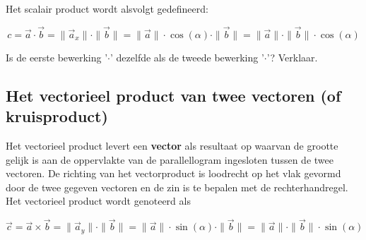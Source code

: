 \documentclass{ximera}
\begin{document}
Het scalair product wordt alsvolgt gedefineerd: 

$$
c = \vec{a} \cdot \vec{b} = \| \vec{a}_x \| \cdot \|\vec{b}\| = \|\vec{a}\| \cdot \cos(\alpha) \cdot \|\vec{b}\| = \| \vec{a}\| \cdot \| \vec{b}\| \cdot \cos(\alpha)
$$

\begin{quickquestion*}{}{}
    Is de eerste bewerking '\(\cdot\)' dezelfde als de tweede bewerking '\(\cdot\)'? Verklaar. 
\end{quickquestion*}

\begin{image}
\end{image}

\subsection*{Het vectorieel product van twee vectoren (of kruisproduct)}

Het vectorieel product levert een \textbf{vector} als resultaat op waarvan de grootte gelijk is aan de oppervlakte van de parallellogram ingesloten tussen de twee vectoren. 
De richting van het vectorproduct is loodrecht op het vlak gevormd door de twee gegeven vectoren en de zin is te bepalen met de rechterhandregel.
Het vectorieel product wordt genoteerd als 

\[
\vec{c} = \vec{a} \times \vec{b} = \| \vec{a}_y \| \cdot \|\vec{b}\| = \|\vec{a}\| \cdot \sin(\alpha) \cdot \|\vec{b}\| = \| \vec{a}\| \cdot \| \vec{b}\| \cdot \sin(\alpha)
\]
\end{document}

